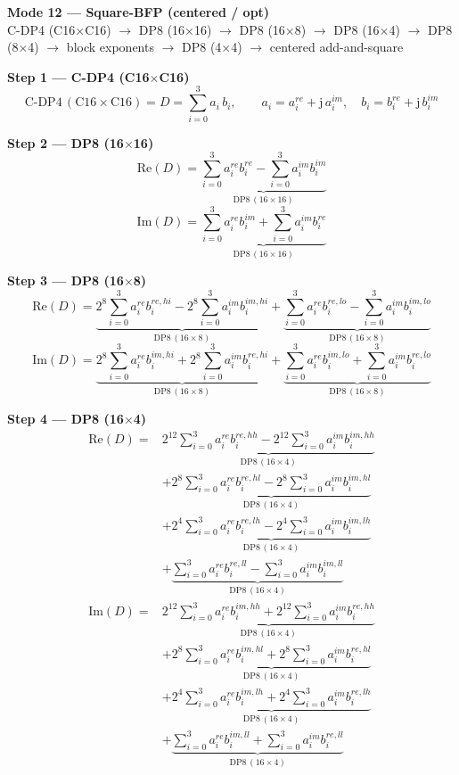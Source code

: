 \documentclass[fleqn]{article}
\newcommand{\DPop}[3]{\mathrm{DP#1}\,(#2\!\times\!#3)}
\begin{document}
\begin{center}
{\LARGE \textbf{Mode 12 --- Square-BFP (centered / opt)}}\\[4pt]
{\large C-DP4 (C16$\times$C16) $\rightarrow$ DP8 (16$\times$16) $\rightarrow$ DP8 (16$\times$8) $\rightarrow$ DP8 (16$\times$4) $\rightarrow$ DP8 (8$\times$4) $\rightarrow$ block exponents $\rightarrow$ DP8 (4$\times$4) $\rightarrow$ centered add-and-square}
\end{center}

\vspace{0.1em}


\textbf{Step 1 --- C-DP4 (C16$\times$C16)}
\[
\text{C-DP4}\,(\mathrm{C16}\!\times\!\mathrm{C16}) = D = \sum_{i=0}^{3} a_i \, b_i, \qquad
a_i = a_i^{re} + \mathrm{j}\,a_i^{im}, \quad
b_i = b_i^{re} + \mathrm{j}\,b_i^{im}
\]

\textbf{Step 2 --- DP8 (16$\times$16)}
\[
\mathrm{Re}(D) = \underbrace{\sum_{i=0}^{3} a_i^{re} b_i^{re}
  - \sum_{i=0}^{3} a_i^{im} b_i^{im}}_{\DPop{8}{16}{16}}
\]
\[
\mathrm{Im}(D) = \underbrace{\sum_{i=0}^{3} a_i^{re} b_i^{im}
  + \sum_{i=0}^{3} a_i^{im} b_i^{re}}_{\DPop{8}{16}{16}}
\]

\textbf{Step 3 --- DP8 (16$\times$8)}
\[
\mathrm{Re}(D) = \underbrace{2^{8}\sum_{i=0}^{3} a_i^{re} b_i^{re,hi}
  - 2^{8}\sum_{i=0}^{3} a_i^{im} b_i^{im,hi}}_{\DPop{8}{16}{8}}
  + \underbrace{\sum_{i=0}^{3} a_i^{re} b_i^{re,lo}
  - \sum_{i=0}^{3} a_i^{im} b_i^{im,lo}}_{\DPop{8}{16}{8}}
\]
\[
\mathrm{Im}(D) = \underbrace{2^{8}\sum_{i=0}^{3} a_i^{re} b_i^{im,hi}
  + 2^{8}\sum_{i=0}^{3} a_i^{im} b_i^{re,hi}}_{\DPop{8}{16}{8}}
  + \underbrace{\sum_{i=0}^{3} a_i^{re} b_i^{im,lo}
  + \sum_{i=0}^{3} a_i^{im} b_i^{re,lo}}_{\DPop{8}{16}{8}}
\]

\textbf{Step 4 --- DP8 (16$\times$4)}
\begin{align*}
\mathrm{Re}(D) = {}
  & \underbrace{2^{12}\sum_{i=0}^{3} a_i^{re} b_i^{re,hh} - 2^{12}\sum_{i=0}^{3} a_i^{im} b_i^{im,hh}}_{\DPop{8}{16}{4}} \\[0.5em]
  & + \underbrace{2^{8}\sum_{i=0}^{3} a_i^{re} b_i^{re,hl} - 2^{8}\sum_{i=0}^{3} a_i^{im} b_i^{im,hl}}_{\DPop{8}{16}{4}} \\[0.5em]
  & + \underbrace{2^{4}\sum_{i=0}^{3} a_i^{re} b_i^{re,lh} - 2^{4}\sum_{i=0}^{3} a_i^{im} b_i^{im,lh}}_{\DPop{8}{16}{4}} \\[0.5em]
  & + \underbrace{\sum_{i=0}^{3} a_i^{re} b_i^{re,ll} - \sum_{i=0}^{3} a_i^{im} b_i^{im,ll}}_{\DPop{8}{16}{4}}
\end{align*}
\begin{align*}
\mathrm{Im}(D) = {}
  & \underbrace{2^{12}\sum_{i=0}^{3} a_i^{re} b_i^{im,hh} + 2^{12}\sum_{i=0}^{3} a_i^{im} b_i^{re,hh}}_{\DPop{8}{16}{4}} \\[0.5em]
  & + \underbrace{2^{8}\sum_{i=0}^{3} a_i^{re} b_i^{im,hl} + 2^{8}\sum_{i=0}^{3} a_i^{im} b_i^{re,hl}}_{\DPop{8}{16}{4}} \\[0.5em]
  & + \underbrace{2^{4}\sum_{i=0}^{3} a_i^{re} b_i^{im,lh} + 2^{4}\sum_{i=0}^{3} a_i^{im} b_i^{re,lh}}_{\DPop{8}{16}{4}} \\[0.5em]
  & + \underbrace{\sum_{i=0}^{3} a_i^{re} b_i^{im,ll} + \sum_{i=0}^{3} a_i^{im} b_i^{re,ll}}_{\DPop{8}{16}{4}}
\end{align*}
\end{document}
